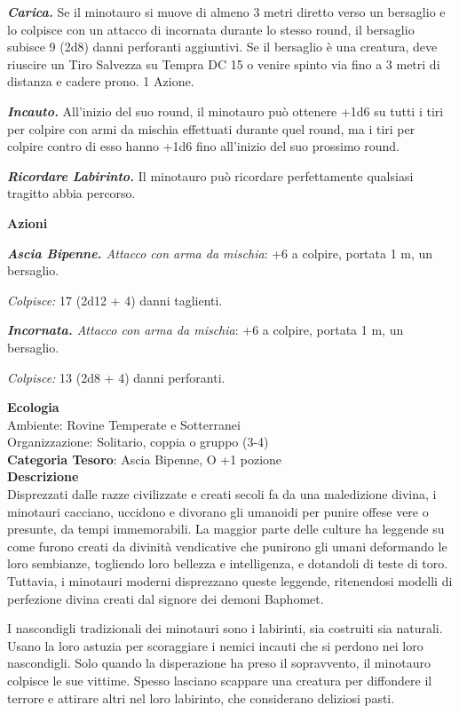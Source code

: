 \begin{multicols}{2}
{\emph{\textbf{Carica.}} Se il minotauro si muove di almeno 3 metri diretto verso un bersaglio e lo colpisce con un attacco di incornata durante lo stesso round, il bersaglio subisce 9 (2d8) danni perforanti aggiuntivi. Se il bersaglio è una creatura, deve riuscire un Tiro Salvezza su Tempra DC 15 o venire spinto via fino a 3 metri di distanza e cadere prono. 1 Azione.

\emph{\textbf{Incauto.}} All'inizio del suo round, il minotauro può ottenere +1d6 su tutti i tiri per colpire con armi da mischia effettuati durante quel round, ma i tiri per colpire contro di esso hanno +1d6 fino all'inizio del suo prossimo round.

\emph{\textbf{Ricordare Labirinto.}} Il minotauro può ricordare perfettamente qualsiasi tragitto abbia percorso.

\textbf{Azioni}

\emph{\textbf{Ascia Bipenne.} Attacco con arma da mischia}: +6 a colpire, portata 1 m, un bersaglio.

\emph{Colpisce:} 17 (2d12 + 4) danni taglienti.

\emph{\textbf{Incornata.} Attacco con arma da mischia}: +6 a colpire, portata 1 m, un bersaglio.

\emph{Colpisce:} 13 (2d8 + 4) danni perforanti.

\textbf{Ecologia}\\
Ambiente: Rovine Temperate e Sotterranei\\
Organizzazione: Solitario, coppia o gruppo (3-4)\\
\textbf{Categoria Tesoro}: Ascia Bipenne, O +1 pozione\\
\textbf{Descrizione}\\
Disprezzati dalle razze civilizzate e creati secoli fa da una maledizione divina, i minotauri cacciano, uccidono e divorano gli umanoidi per punire offese vere o presunte, da tempi immemorabili. La maggior parte delle culture ha leggende su come furono creati da divinità vendicative che punirono gli umani deformando le loro sembianze, togliendo loro bellezza e intelligenza, e dotandoli di teste di toro. Tuttavia, i minotauri moderni disprezzano queste leggende, ritenendosi modelli di perfezione divina creati dal signore dei demoni Baphomet.

I nascondigli tradizionali dei minotauri sono i labirinti, sia costruiti sia naturali. Usano la loro astuzia per scoraggiare i nemici incauti che si perdono nei loro nascondigli. Solo quando la disperazione ha preso il sopravvento, il minotauro colpisce le sue vittime. Spesso lasciano scappare una creatura per diffondere il terrore e attirare altri nel loro labirinto, che considerano deliziosi pasti.

}
\end{multicols}
